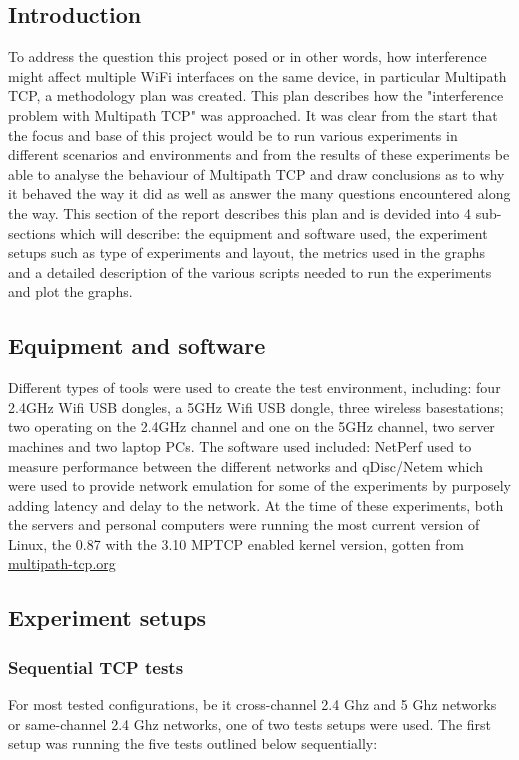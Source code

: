 \subsection{Introduction}
To address the question this project posed or in other words, how interference 
might affect multiple WiFi interfaces on the same device, in particular 
Multipath TCP, a methodology plan was created. This plan describes how the 
"interference problem with Multipath TCP" was approached. 
It was clear from the start that the focus and base of this project would be to 
run various experiments in different scenarios and environments and from the 
results of these experiments be able to analyse the behaviour of Multipath TCP 
and draw conclusions as to why it behaved the way it did as well as answer the 
many questions encountered along the way. 
This section of the report describes this plan and is devided into 4 
sub-sections which will describe: the equipment and software used, the 
experiment setups such as type of experiments and layout, the metrics used in 
the graphs and a detailed description of the various scripts needed to run the 
experiments and plot the 
graphs.

\subsection{Equipment and software}
Different types of tools were used to create the test environment, including:
four 2.4GHz Wifi USB dongles, a 5GHz Wifi USB dongle, three wireless 
basestations; two operating on the 2.4GHz channel and one on the 5GHz channel, 
two server machines and two laptop PCs. The software used included: NetPerf used 
to measure performance between the different networks and qDisc/Netem which were 
used to provide network emulation for some of the experiments by purposely 
adding latency and delay to the network.
At the time of these experiments, both the servers and personal computers were 
running the most current version of Linux, the 0.87 with the 3.10 MPTCP enabled 
kernel version, gotten from \href{http://multipath-tcp.org/}{multipath-tcp.org}
 

\subsection{Experiment setups}
\subsubsection{Sequential TCP tests}
For most tested configurations, be it cross-channel 2.4 Ghz and 5 Ghz networks
or same-channel 2.4 Ghz networks, one of two tests setups were used. The first 
setup was running the five tests outlined below
sequentially:

